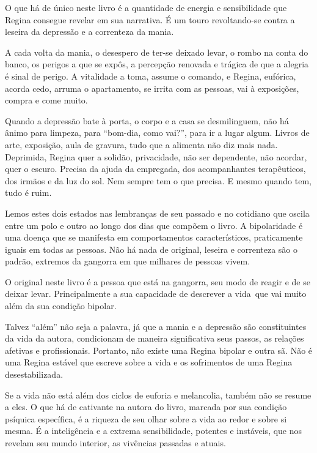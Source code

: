 \asterisc

O que há de único neste livro é a quantidade de energia e sensibilidade
que Regina consegue revelar em sua narrativa. É um touro revoltando-se
contra a leseira da depressão e a correnteza da mania.

A cada volta da mania, o desespero de ter-se deixado levar, o rombo na
conta do banco, os perigos a que se expôs, a percepção renovada e
trágica de que a alegria é sinal de perigo. A vitalidade a toma, assume
o comando, e Regina, eufórica, acorda cedo, arruma o apartamento, se
irrita com as pessoas, vai à exposições, compra e come muito.

Quando a depressão bate à porta, o corpo e a casa se desmilinguem, não
há ânimo para limpeza, para ``bom-dia, como vai?'', para ir a lugar
algum. Livros de arte, exposição, aula de gravura, tudo que a alimenta
não diz mais nada. Deprimida, Regina quer a solidão, privacidade, não
ser dependente, não acordar, quer o escuro. Precisa da ajuda da
empregada, dos acompanhantes terapêuticos, dos irmãos e da luz do sol.
Nem sempre tem o que precisa. E mesmo quando tem, tudo é ruim.

Lemos estes dois estados nas lembranças de seu passado e no cotidiano
que oscila entre um polo e outro ao longo dos dias que compõem o livro.
A bipolaridade é uma doença que se manifesta em comportamentos
característicos, praticamente iguais em todas as pessoas. Não há nada de
original, leseira e correnteza são o padrão, extremos da gangorra em que
milhares de pessoas vivem.

O original neste livro é a pessoa que está na gangorra, seu modo de
reagir e de se deixar levar. Principalmente a sua capacidade de
descrever a vida~que vai muito além da sua condição bipolar.

Talvez ``além'' não seja a palavra, já que a mania e a depressão são
constituintes da vida da autora, condicionam de maneira significativa
seus passos, as relações afetivas e profissionais. Portanto, não existe
uma Regina bipolar e outra sã. Não é uma Regina estável que escreve
sobre a vida e os sofrimentos de uma Regina desestabilizada.

Se a vida não está além dos ciclos de euforia e melancolia, também não
se resume a eles. O que há de cativante na autora do livro, marcada por
sua condição psíquica específica, é a riqueza de seu olhar sobre a vida
ao redor e sobre si mesma. É a inteligência e a extrema sensibilidade,
potentes e instáveis, que nos revelam seu mundo interior, as vivências
passadas e atuais.

